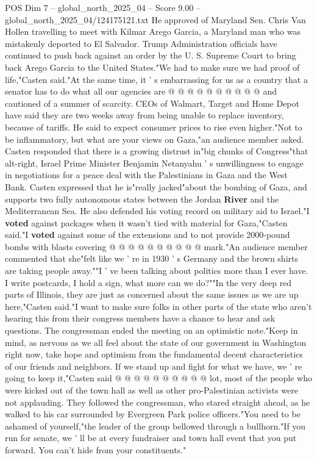 \begin{textsample}{POS Dim 7 – global\_north\_2025\_04 – Score 9.00 – global\_north\_2025\_04/124175121.txt}
He approved of Maryland Sen.
Chris Van Hollen travelling to meet with Kilmar Arego Garcia, a Maryland man who was mistakenly deported to El Salvador.
Trump Administration officials have continued to push back against an order by the U.
S.
Supreme Court to bring back Arego Garcia to the United States."We had to make sure we had proof of life,"Casten said."At the same time, it ' s embarrassing for us as a country that a senator has to do what all our agencies are @ @ @ @ @ @ @ @ @ @ and cautioned of a summer of scarcity.
CEOs of Walmart, Target and Home Depot have said they are two weeks away from being unable to replace inventory, because of tariffs.
He said to expect consumer prices to rise even higher."Not to be inflammatory, but what are your views on Gaza,"an audience member asked.
Casten responded that there is a growing distrust in"big chunks of Congress"that alt-right, Israel Prime Minister Benjamin Netanyahu ' s unwillingness to engage in negotiations for a peace deal with the Palestinians in Gaza and the West Bank.
Casten expressed that he is"really jacked"about the bombing of Gaza, and supports two fully autonomous states between the Jordan \textbf{River} and the Mediterranean Sea.
He also defended his voting record on military aid to Israel."I \textbf{voted} against packages when it wasn't tied with material for Gaza,"Casten said."I \textbf{voted} against some of the extensions and to not provide 2000-pound bombs with blasts covering @ @ @ @ @ @ @ @ @ @ mark."An audience member commented that she"felt like we ' re in 1930 ' s Germany and the brown shirts are taking people away.""I ' ve been talking about politics more than I ever have.
I write postcards, I hold a sign, what more can we do?""In the very deep red parts of Illinois, they are just as concerned about the same issues as we are up here,"Casten said."I want to make sure folks in other parts of the state who aren't hearing this from their congress members have a chance to hear and ask questions.
The congressman ended the meeting on an optimistic note."Keep in mind, as nervous as we all feel about the state of our government in Washington right now, take hope and optimism from the fundamental decent characteristics of our friends and neighbors.
If we stand up and fight for what we have, we ' re going to keep it,"Casten said @ @ @ @ @ @ @ @ @ @ lot, most of the people who were kicked out of the town hall as well as other pro-Palestinian activists were not applauding.
They followed the congressman, who stared straight ahead, as he walked to his car surrounded by Evergreen Park police officers."You need to be ashamed of yourself,"the leader of the group bellowed through a bullhorn."If you run for senate, we ' ll be at every fundraiser and town hall event that you put forward.
You can't hide from your constituents."

\end{textsample}
